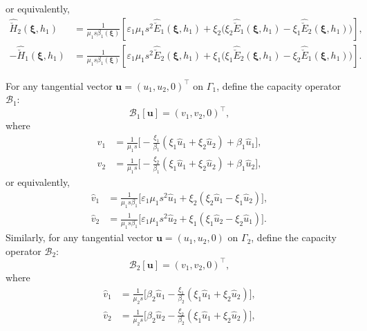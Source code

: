 \documentclass[11pt,reqno]{amsart}
\numberwithin{equation}{section}
\begin{document}
or equivalently,
\begin{align*}
\hat {\breve H}_2(\boldsymbol \xi, h_1)&=\frac{1}{\mu_1 s \beta_1(\boldsymbol
\xi)}\left[\varepsilon_1 \mu_1 s^2 \hat {\breve E}_1(\boldsymbol \xi,
h_1)+\xi_2\bigl(\xi_2 \hat {\breve E}_1(\boldsymbol \xi, h_1)-\xi_1 \hat {\breve
E}_2 (\boldsymbol \xi, h_1 )\bigr)\right],\\
-\hat {\breve H}_1(\boldsymbol \xi, h_1)&=\frac{1}{\mu_1 s \beta_1(\boldsymbol
\xi)} \left[\varepsilon_1 \mu_1 s^2 \hat {\breve E}_2 (\boldsymbol \xi, h_1)+
\xi_1 \bigl(\xi_1 \hat {\breve E}_2(\boldsymbol \xi, h_1) -\xi_2 \hat {\breve
E}_1(\boldsymbol \xi, h_1)\bigr)\right].
\end{align*}

For any tangential vector $\boldsymbol u= (u_1, u_2, 0)^{\top}$ on $\Gamma_1$, 
define the capacity operator $\mathscr B_1$:
\[
\mathscr B_1 [\boldsymbol u]=(v_1, v_2, 0)^{\top},
\]
where
\begin{subequations}\label{CO1}
\begin{align}
\hat v_1&=\frac{1}{\mu_1 s}\big[-\frac{\xi_1}{ \beta_1}(\xi_1 \hat u_1 +\xi_2
\hat u_2)+ \beta_1 \hat u_1\big],\\
\hat v_2&=\frac{1}{ \mu_1 s} \big[- \frac{\xi_2}{\beta_1}(\xi_1 \hat u_1+\xi_2
\hat u_2)+\beta_1 \hat u_2 \big],
\end{align}
\end{subequations}
or equivalently,
\begin{subequations}\label{CO2}
\begin{align}
\hat v_1&=\frac{1}{\mu_1 s \beta_1}\big[ \varepsilon_1 \mu_1 s^2 \hat u_1 +
\xi_2 (\xi_2 \hat u_1 -\xi_1 \hat u_2)\big],\\
\hat v_2&= \frac{1}{ \mu_1 s \beta_1 } \big [ \varepsilon_1 \mu_1 s^2 \hat u_2
+\xi_1 (\xi_1 \hat u_2 -\xi_2 \hat u_1) \big].
\end{align}
\end{subequations}
Similarly, for any tangential vector $\boldsymbol u= (u_1, u_2, 0)$ on
$\Gamma_2$, define the capacity operator $\mathscr B_2$:
\[
\mathscr B_2 [\boldsymbol u] =(v_1, v_2, 0)^{\top},
\]
where
\begin{subequations}\label{CO3}
\begin{align}
\hat v_1&=\frac{1}{\mu_2 s}\big[\beta_2 \hat u_1 -\frac{\xi_1}{ \beta_2}(\xi_1
\hat u_1+\xi_2 \hat u_2) \big],\\
\hat v_2&=\frac{1}{ \mu_2 s} \big[ \beta_2 \hat u_2 -\frac{\xi_2}{ \beta_2}
(\xi_1 \hat u_1+\xi_2 \hat u_2) \big],
\end{align}
\end{subequations}
\end{document}
